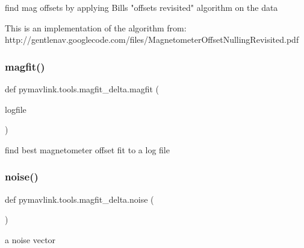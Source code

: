 \begin{DoxyVerb}find mag offsets by applying Bills "offsets revisited" algorithm
   on the data

   This is an implementation of the algorithm from:
      http://gentlenav.googlecode.com/files/MagnetometerOffsetNullingRevisited.pdf\end{DoxyVerb}
 \mbox{\label{namespacepymavlink_1_1tools_1_1magfit__delta_a29df37e1c387e2a17988c9028c7c9b6e}} 
\subsubsection{\texorpdfstring{magfit()}{magfit()}}
{\footnotesize\ttfamily def pymavlink.\+tools.\+magfit\+\_\+delta.\+magfit (\begin{DoxyParamCaption}\item[{}]{logfile }\end{DoxyParamCaption})}

\begin{DoxyVerb}find best magnetometer offset fit to a log file\end{DoxyVerb}
 \mbox{\label{namespacepymavlink_1_1tools_1_1magfit__delta_a916fe58238a78962c0fe73909e6acafe}} 
\subsubsection{\texorpdfstring{noise()}{noise()}}
{\footnotesize\ttfamily def pymavlink.\+tools.\+magfit\+\_\+delta.\+noise (\begin{DoxyParamCaption}{ }\end{DoxyParamCaption})}

\begin{DoxyVerb}a noise vector\end{DoxyVerb}
 